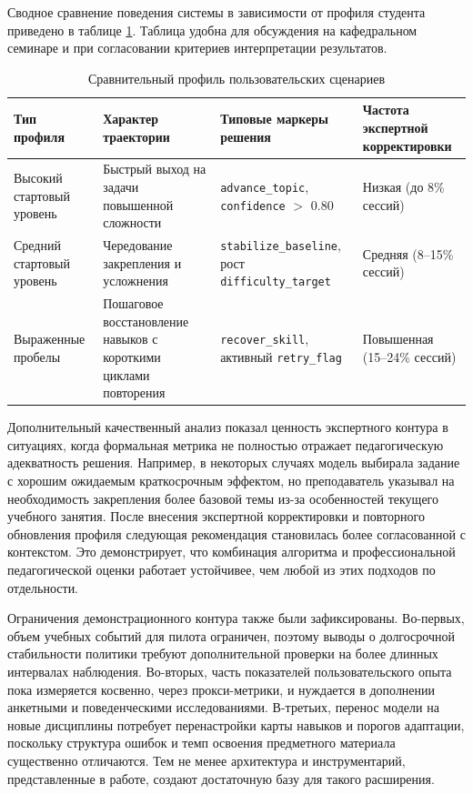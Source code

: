 Сводное сравнение поведения системы в зависимости от профиля студента приведено
в таблице \ref{tab:profile-comparison}. Таблица удобна для обсуждения на
кафедральном семинаре и при согласовании критериев интерпретации результатов.

\begin{table}[htbp]
  \caption{Сравнительный профиль пользовательских сценариев}
  \label{tab:profile-comparison}
  \centering

  \begin{tabular}{|p{}|p{}|p{}|p{}|}
    \hline
    Тип профиля & Характер траектории & Типовые маркеры решения & Частота экспертной корректировки \\
    \hline
    Высокий стартовый уровень & Быстрый выход на задачи повышенной сложности & \texttt{advance\_topic}, \texttt{confidence} $>$ 0.80 & Низкая (до 8\% сессий) \\
    \hline
    Средний стартовый уровень & Чередование закрепления и усложнения & \texttt{stabilize\_baseline}, рост \texttt{difficulty\_target} & Средняя (8--15\% сессий) \\
    \hline
    Выраженные пробелы & Пошаговое восстановление навыков с короткими циклами повторения & \texttt{recover\_skill}, активный \texttt{retry\_flag} & Повышенная (15--24\% сессий) \\
    \hline
  \end{tabular}
\end{table}

Дополнительный качественный анализ показал ценность экспертного контура в
ситуациях, когда формальная метрика не полностью отражает педагогическую
адекватность решения. Например, в некоторых случаях модель выбирала задание с
хорошим ожидаемым краткосрочным эффектом, но преподаватель указывал на
необходимость закрепления более базовой темы из-за особенностей текущего
учебного занятия. После внесения экспертной корректировки и повторного
обновления профиля следующая рекомендация становилась более согласованной с
контекстом. Это демонстрирует, что комбинация алгоритма и профессиональной
педагогической оценки работает устойчивее, чем любой из этих подходов по
отдельности.

Ограничения демонстрационного контура также были зафиксированы. Во-первых,
объем учебных событий для пилота ограничен, поэтому выводы о долгосрочной
стабильности политики требуют дополнительной проверки на более длинных
интервалах наблюдения. Во-вторых, часть показателей пользовательского опыта
пока измеряется косвенно, через прокси-метрики, и нуждается в дополнении
анкетными и поведенческими исследованиями. В-третьих, перенос модели на новые
дисциплины потребует перенастройки карты навыков и порогов адаптации, поскольку
структура ошибок и темп освоения предметного материала существенно отличаются.
Тем не менее архитектура и инструментарий, представленные в работе, создают
достаточную базу для такого расширения.

